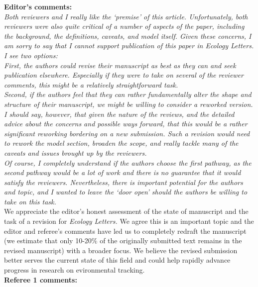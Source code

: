 \documentclass[11pt]{article}
\begin{document}
{\bf Editor's comments:} \\

\emph{Both reviewers and I really like the `premise' of this article.  Unfortunately, both
reviewers were also quite critical of a number of aspects of the paper, including the
background, the definitions, caveats, and model itself.  Given these concerns, I am sorry to
say that I cannot support publication of this paper in Ecology Letters.  I see two options:}\\

\emph{First, the authors could revise their manuscript as best as they can and seek publication
elsewhere. Especially if they were to take on several of the reviewer comments, this might be
a relatively straightforward task.}\\

\emph{Second, if the authors feel that they can rather fundamentally alter the shape and structure
of their manuscript, we might be willing to consider a reworked version. I should say,
however, that given the nature of the reviews, and the detailed advice about the concerns and
possible ways forward, that this would be a rather significant reworking bordering on a new
submission. Such a revision would need to rework the model section, broaden the scope, and
really tackle many of the caveats and issues brought up by the reviewers.}\\

\emph{Of course, I completely understand if the authors choose the first pathway, as the second
pathway would be a lot of work and there is no guarantee that it would satisfy the reviewers.
Nevertheless, there is important potential for the authors and topic, and I wanted to leave
the `door open' should the authors be willing to take on this task.}\\

We appreciate the editor's honest assessment of the state of manuscript and the task of a revision for \emph{Ecology Letters.} We agree this is an important topic and the editor and referee's comments have led us to completely redraft the manuscript (we estimate that only 10-20\% of the originally submitted text remains in the revised manuscript) with a broader focus. We believe the revised submission better serves the current state of this field and could help rapidly advance progress in research on evironmental tracking.\\

{\bf Referee 1 comments:} \\
\end{document}
